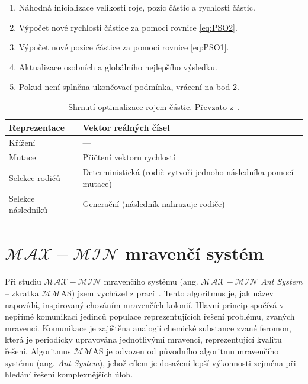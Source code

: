 \begin{enumerate}
    \item Náhodná inicializace velikosti roje, pozic částic a rychlosti částic.
    \item Výpočet nové rychlosti částice za pomoci rovnice \eqref{eq:PSO2}.
    \item Výpočet nové pozice částice za pomoci rovnice \eqref{eq:PSO1}.
    \item Aktualizace osobních a globálního nejlepšího výsledku.
    \item Pokud není splněna ukončovací podmínka, vrácení na bod 2.
\end{enumerate}

\begin{table}[htp]
\centering
\caption{Shrnutí optimalizace rojem částic. Převzato z~\cite{introductionEvo}.}
\label{tab:PSO}
\begin{tabular}{|l|l|}
\hline
Reprezentace & Vektor reálných čísel \\ \hline
Křížení & --- \\ \hline
Mutace & Přičtení vektoru rychlostí \\ \hline
Selekce rodičů & Deterministická (rodič vytvoří jednoho následníka pomocí mutace) \\ \hline
Selekce následníků & Generační (následník nahrazuje rodiče) \\ \hline
\end{tabular}
\end{table}


\section{$\mathcal{MAX}\!{-}\!\mathcal{MIN}$ mravenčí systém}
\label{sec:mmas}
Při studiu $\mathcal{MAX}\!{-}\!\mathcal{MIN}$ mravenčího systému (ang. $\mathcal{MAX}\!{-}\!\mathcal{MIN}$ \emph{Ant System} -- zkratka $\mathcal{MM}$AS) jsem vycházel z prací~\cite{naturalEvoAlgs, MMAS}. Tento algoritmus je, jak název napovídá, inspirovaný chováním mravenčích kolonií. Hlavní princip spočívá v nepřímé komunikaci jedinců populace reprezentujících řešení problému, zvaných mravenci. Komunikace je zajištěna analogií chemické substance zvané feromon, která je periodicky upravována jednotlivými mravenci, reprezentující kvalitu řešení. Algoritmus $\mathcal{MM}$AS je odvozen od původního algoritmu mravenčího systému (ang. \emph{Ant System}), jehož cílem je dosažení lepší výkonnosti zejména při hledání řešení komplexnějších úloh.

